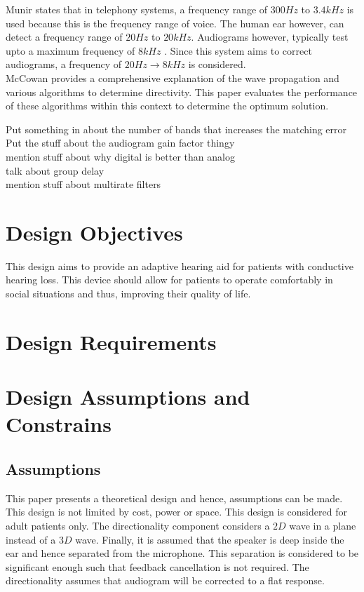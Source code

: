 \documentclass[12pt, onecolumn]{article}
\begin{document}
\newline
\noindent Munir \cite{munir} states that in telephony systems, a frequency range of $300Hz$ to $3.4kHz$ is used because this is the frequency range of voice. The human ear however, can detect a frequency range of $20Hz$ to $20kHz$. Audiograms however, typically test upto a maximum frequency of $8kHz$ \cite{audioMaxFreq}. Since this system aims to correct audiograms, a frequency of $20Hz \rightarrow 8kHz$ is considered.\\
\newline
\noindent McCowan \cite{mccowan} provides a comprehensive explanation of the wave propagation and various algorithms to determine directivity. This paper evaluates the performance of these algorithms within this context to determine the optimum solution.\\
\newline

Put something in about the number of bands that increases the matching error
Put the stuff about the audiogram gain factor thingy\\
mention stuff about why digital is better than analog\\
talk about group delay\\
mention stuff about multirate filters
\section{Design Objectives}

\noindent This design aims to provide an adaptive hearing aid for patients with conductive hearing loss. This device should allow for patients to operate comfortably in social situations and thus, improving their quality of life.

\section{Design Requirements}


\section{Design Assumptions and Constrains}

\subsection{Assumptions}

\noindent This paper presents a theoretical design and hence, assumptions can be made. This design is not limited by cost, power or space. This design is considered for adult patients only. The directionality component considers a $2D$ wave in a plane instead of a $3D$ wave. Finally, it is assumed that the speaker is deep inside the ear and hence separated from the microphone. This separation is considered to be significant enough such that feedback cancellation is not required. The directionality assumes that audiogram will be corrected to a flat response.
\end{document}
